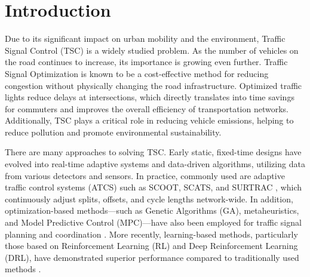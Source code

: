 \chapter*{Introduction}

%
%
%
%

Due to its significant impact on urban mobility and the environment, Traffic Signal Control (TSC) is a widely studied problem. As the number of vehicles on the road continues to increase, its importance is growing even further.
Traffic Signal Optimization is known to be a cost-effective method for reducing congestion without physically changing the road infrastructure.
Optimized traffic lights reduce delays at intersections, which directly translates into time savings for commuters and improves the overall efficiency of transportation networks.
Additionally, TSC plays a critical role in reducing vehicle emissions, helping to reduce pollution and promote environmental sustainability.

There are many approaches \cite{qadri2020state} to solving TSC. Early static, fixed-time designs have evolved into real-time adaptive systems and data-driven algorithms, utilizing data from various detectors and sensors. In practice, commonly used are adaptive traffic control systems (ATCS) such as SCOOT, SCATS, and SURTRAC \cite{smith2013surtrac}, which continuously adjust splits, offsets, and cycle lengths network-wide. In addition, optimization-based methods---such as Genetic Algorithms (GA), metaheuristics, and Model Predictive Control (MPC)---have also been employed for traffic signal planning and coordination \cite{qadri2020state, ye2019survey}. More recently, learning-based methods, particularly those based on Reinforcement Learning (RL) and Deep Reinforcement Learning (DRL), have demonstrated superior performance compared to traditionally used methods \cite{zhao2024survey, saadi2025survey}.

